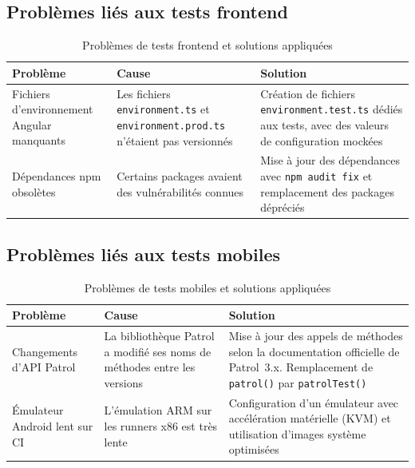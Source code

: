 \subsection{Probl\`{e}mes li\'{e}s aux tests frontend}

\begin{table}[H]
\centering
\caption{Probl\`{e}mes de tests frontend et solutions appliqu\'{e}es}
\label{tab:problemes-frontend}
\begin{tabularx}{\textwidth}{|X|X|X|}
\hline
\rowcolor{speedlineBlue!10}
\textbf{Probl\`{e}me} & \textbf{Cause} & \textbf{Solution} \\
\hline
Fichiers d'environnement Angular manquants &
Les fichiers \texttt{environment.ts} et \texttt{environment.prod.ts}
n'\'{e}taient pas versionn\'{e}s &
Cr\'{e}ation de fichiers \texttt{environment.test.ts} d\'{e}di\'{e}s aux
tests, avec des valeurs de configuration mock\'{e}es \\
\hline
D\'{e}pendances npm obsol\`{e}tes &
Certains packages avaient des vuln\'{e}rabilit\'{e}s connues &
Mise \`{a} jour des d\'{e}pendances avec \texttt{npm audit fix} et
remplacement des packages d\'{e}pr\'{e}ci\'{e}s \\
\hline
\end{tabularx}
\end{table}

\subsection{Probl\`{e}mes li\'{e}s aux tests mobiles}

\begin{table}[H]
\centering
\caption{Probl\`{e}mes de tests mobiles et solutions appliqu\'{e}es}
\label{tab:problemes-mobile}
\begin{tabularx}{\textwidth}{|X|X|X|}
\hline
\rowcolor{speedlineBlue!10}
\textbf{Probl\`{e}me} & \textbf{Cause} & \textbf{Solution} \\
\hline
Changements d'API Patrol &
La biblioth\`{e}que Patrol a modifi\'{e} ses noms de m\'{e}thodes
entre les versions &
Mise \`{a} jour des appels de m\'{e}thodes selon la documentation
officielle de Patrol~3.x. Remplacement de
\texttt{patrol()} par \texttt{patrolTest()} \\
\hline
\'{E}mulateur Android lent sur CI &
L'\'{e}mulation ARM sur les runners x86 est tr\`{e}s lente &
Configuration d'un \'{e}mulateur avec acc\'{e}l\'{e}ration mat\'{e}rielle
(KVM) et utilisation d'images syst\`{e}me optimis\'{e}es \\
\hline
\end{tabularx}
\end{table}

